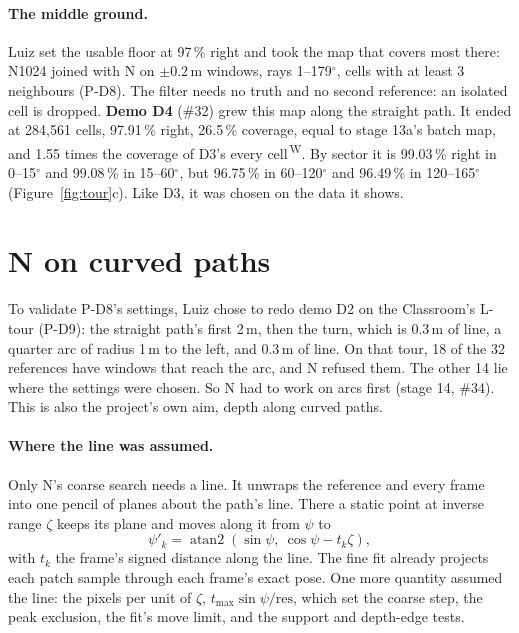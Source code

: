 \documentclass[11pt,a4paper]{article}
\newcommand{\src}[1]{\textsuperscript{\,#1}}
\newcommand{\WS}{\src{W}}   %
\begin{document}
\paragraph{The middle ground.} Luiz set the usable floor at 97\,\% right and took the map that covers most there:
N1024 joined with N on $\pm0.2$\,m windows, rays 1--179$^\circ$, cells with at least 3 neighbours (P-D8). The filter
needs no truth and no second reference: an isolated cell is dropped. \textbf{Demo D4} (\#32) grew this map along the
straight path. It ended at 284,561 cells, 97.91\,\% right, 26.5\,\% coverage, equal to stage 13a's batch map, and 1.55
times the coverage of D3's every cell\WS. By sector it is 99.03\,\% right in 0--15$^\circ$ and 99.08\,\% in
15--60$^\circ$, but 96.75\,\% in 60--120$^\circ$ and 96.49\,\% in 120--165$^\circ$ (Figure~\ref{fig:tour}c). Like D3,
it was chosen on the data it shows.

\section{N on curved paths}\label{sec:arcs}

To validate P-D8's settings, Luiz chose to redo demo D2 on the Classroom's L-tour (P-D9): the straight path's first
2\,m, then the turn, which is 0.3\,m of line, a quarter arc of radius 1\,m to the left, and 0.3\,m of line. On that tour,
18 of the 32 references have windows that reach the arc, and N refused them. The other 14 lie where the settings were
chosen. So N had to work on arcs first (stage 14, \#34). This is also the project's own aim, depth along curved paths.

\paragraph{Where the line was assumed.} Only N's coarse search needs a line. It unwraps the reference and every frame
into one pencil of planes about the path's line. There a static point at inverse range $\zeta$ keeps its plane and moves
along it from $\psi$ to
\begin{equation}
\psi'_k=\operatorname{atan2}\left(\sin\psi,\ \cos\psi-t_k\zeta\right),\label{eq:shift}
\end{equation}
with $t_k$ the frame's signed distance along the line. The fine fit already projects each patch sample through each
frame's exact pose. One more quantity assumed the line: the pixels per unit of $\zeta$, $t_{\max}\sin\psi/\text{res}$,
which set the coarse step, the peak exclusion, the fit's move limit, and the support and depth-edge tests.
\end{document}

